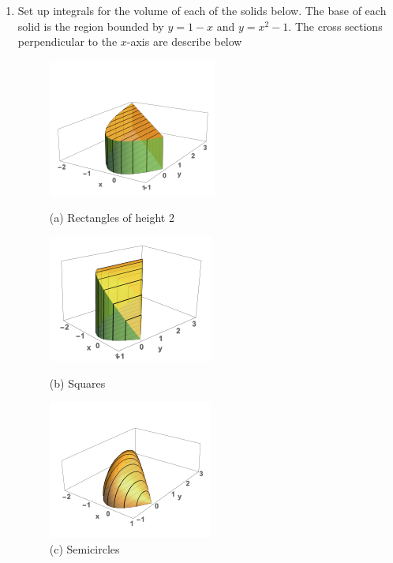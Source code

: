 \documentclass{article}
\begin{document}
\begin{enumerate}[label=\textbf{(8.\arabic*)}]



\item Set up integrals for the volume of each of the solids below. The base of each solid is the region bounded by $y=1-x$ and $y=x^2-1$. The cross sections perpendicular to the $x$-axis are describe below
\begin{figure}[H]
    \centering
    \begin{minipage}{0.33\textwidth}
        \centering
        \includegraphics[scale=.5]{rect} %
        \caption*{(a) Rectangles of height 2}
    \end{minipage}\hfill
    \begin{minipage}{0.33\textwidth}
        \centering
        \includegraphics[scale=.5]{sqr} %
        \caption*{(b) Squares}
    \end{minipage}
        \begin{minipage}{0.33\textwidth}
        \centering
        \includegraphics[scale=.5]{circ} %
        \caption*{(c) Semicircles}
    \end{minipage}\hfill
\end{figure}


\end{enumerate}
\end{document}
